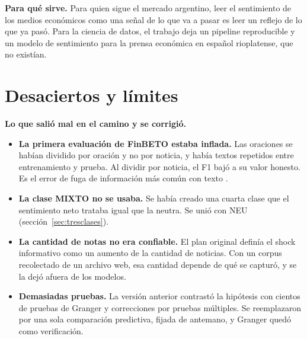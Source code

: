 \textbf{Para qué sirve.} Para quien sigue el mercado argentino, leer el sentimiento de los medios
económicos como una señal de lo que va a pasar es leer un reflejo de lo que ya pasó. Para la
ciencia de datos, el trabajo deja un pipeline reproducible y un modelo de sentimiento para la
prensa económica en español rioplatense, que no existían.

\section{Desaciertos y límites}
\label{sec:limites}

\textbf{Lo que salió mal en el camino y se corrigió.}
\begin{itemize}
  \item \textbf{La primera evaluación de FinBETO estaba inflada.} Las oraciones se habían dividido
        por oración y no por noticia, y había textos repetidos entre entrenamiento y prueba. Al
        dividir por noticia, el F1 bajó a su valor honesto. Es el error de fuga de información más
        común con texto \citep{kapoor2023leakage}.
  \item \textbf{La clase MIXTO no se usaba.} Se había creado una cuarta clase que el sentimiento
        neto trataba igual que la neutra. Se unió con NEU (sección~\ref{sec:tresclases}).
  \item \textbf{La cantidad de notas no era confiable.} El plan original definía el shock
        informativo como un aumento de la cantidad de noticias. Con un corpus recolectado de un
        archivo web, esa cantidad depende de qué se capturó, y se la dejó afuera de los modelos.
  \item \textbf{Demasiadas pruebas.} La versión anterior contrastó la hipótesis con cientos de
        pruebas de Granger y correcciones por pruebas múltiples. Se reemplazaron por una sola
        comparación predictiva, fijada de antemano, y Granger quedó como verificación.
\end{itemize}

